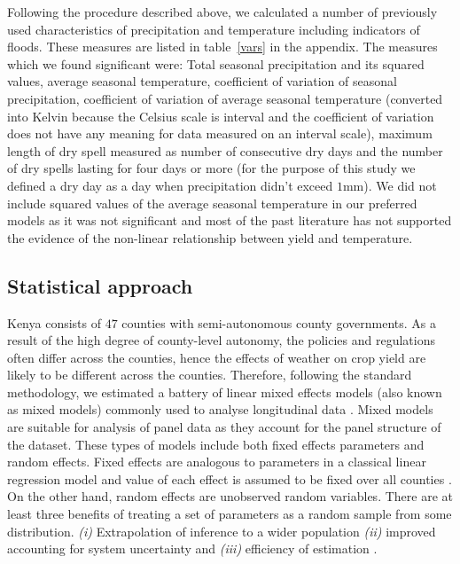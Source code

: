 \documentclass[12pt]{iopart}
\begin{document}
Following the procedure described above, we calculated a number of previously used characteristics of precipitation and temperature including indicators of floods. These measures are listed in table~\ref{vars} in the appendix. The measures which we found significant were: Total seasonal precipitation and its squared values, average seasonal temperature, coefficient of variation of seasonal precipitation, coefficient of variation of average seasonal temperature (converted into Kelvin because the Celsius scale is interval and the coefficient of variation does not have any meaning for data measured on an interval scale),  maximum length of dry spell measured as number of consecutive dry days and the number of dry spells lasting for four days or more (for the purpose of this study we defined a dry day as a day when precipitation didn't exceed $1$mm). We did not include squared values of the average seasonal temperature in our preferred models as it was not significant and most of the past literature has not supported the evidence of the non-linear relationship between yield and temperature.
\subsection{Statistical approach}\label{stats}


\sloppy
Kenya consists of $47$ counties with semi-autonomous county governments. As a result of the high degree of county-level autonomy, the policies and regulations often differ across the counties, hence the effects of weather on crop yield are likely to be different across the counties. Therefore, following the standard methodology, we estimated a battery of linear mixed effects models (also known as mixed models) commonly used to analyse longitudinal data \cite{bates2000mixed}. Mixed models are suitable for analysis of panel data as they account for the panel structure of the dataset. These types of models include both fixed effects parameters and random effects. Fixed effects are analogous to parameters in a classical linear regression model and value of each effect is assumed to be fixed over all counties \cite{bates2010lme4}. On the other hand, random effects are unobserved random variables. There are at least three benefits of treating a set of parameters as a random sample from some distribution. \textit{(i)} Extrapolation of inference to a wider population \textit{(ii)} improved accounting for system uncertainty and \textit{(iii)} efficiency of estimation \cite{KERYch9,KERYch12}.
\end{document}
